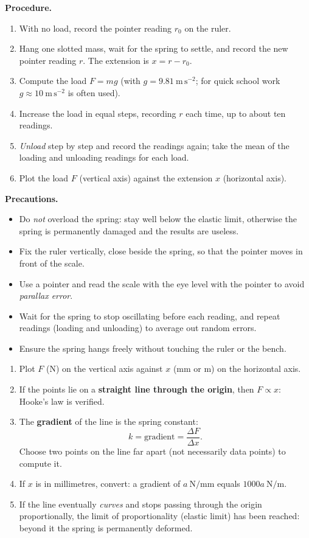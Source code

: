 \documentclass[11pt]{article}
\newcommand{\cle}[1]{{\popxbold\color{popdark}#1}}
\begin{document}
\begin{experience}
\textbf{Procedure.}
\begin{enumerate}
\item With no load, record the pointer reading $r_0$ on the ruler.
\item Hang one slotted mass, wait for the spring to settle, and record the new pointer reading $r$. The extension is $x = r - r_0$.
\item Compute the load $F = mg$ (with $g = 9.81\ \mathrm{m\,s^{-2}}$; for quick school work $g \approx 10\ \mathrm{m\,s^{-2}}$ is often used).
\item Increase the load in equal steps, recording $r$ each time, up to about ten readings.
\item \emph{Unload} step by step and record the readings again; take the mean of the loading and unloading readings for each load.
\item Plot the load $F$ (vertical axis) against the extension $x$ (horizontal axis).
\end{enumerate}

\textbf{Precautions.}
\begin{itemize}
\item Do \emph{not} overload the spring: stay well below the elastic limit, otherwise the spring is permanently damaged and the results are useless.
\item Fix the ruler vertically, close beside the spring, so that the pointer moves in front of the scale.
\item Use a pointer and read the scale with the eye level with the pointer to avoid \emph{parallax error}.
\item Wait for the spring to stop oscillating before each reading, and repeat readings (loading and unloading) to average out random errors.
\item Ensure the spring hangs freely without touching the ruler or the bench.
\end{itemize}
\end{experience}

\begin{methode}
\begin{enumerate}
\item Plot $F$ (N) on the vertical axis against $x$ (mm or m) on the horizontal axis.
\item If the points lie on a \textbf{straight line through the origin}, then $F \propto x$: Hooke's law is verified.
\item The \textbf{gradient} of the line is the spring constant:
\[ k = \text{gradient} = \frac{\Delta F}{\Delta x}. \]
Choose two points on the line far apart (not necessarily data points) to compute it.
\item If $x$ is in millimetres, convert: a gradient of $a\ \mathrm{N/mm}$ equals $1000a\ \mathrm{N/m}$.
\item If the line eventually \emph{curves} and stops passing through the origin proportionally, the \cle{limit of proportionality} (elastic limit) has been reached: beyond it the spring is permanently deformed.
\end{enumerate}
\end{methode}
\end{document}
